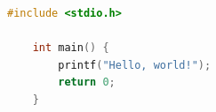 
\begin{lstlisting}[language=C, caption={\codecaption}, label={\codelabel}, frame=single, float=!htpb]
	#include <stdio.h>
	
	int main() {
		printf("Hello, world!");
		return 0;
	}
\end{lstlisting}

\MediaOptionLogicBlank